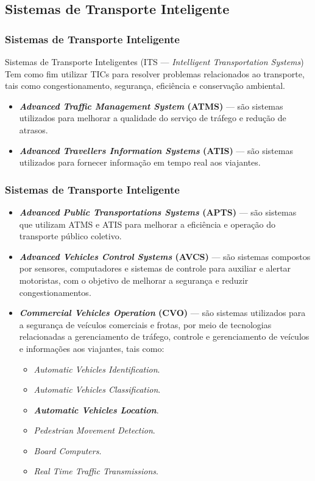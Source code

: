 \documentclass{beamer}
\begin{document}
\subsection{Sistemas de Transporte Inteligente}
\begin{frame}
\frametitle{Sistemas de Transporte Inteligente}
\begin{block}{Sistemas de Transporte Inteligentes (ITS --- \textit{Intelligent Transportation Systems})}
Tem como fim utilizar TICs para resolver problemas relacionados ao transporte, tais como congestionamento, segurança, eficiência e conservação ambiental. 
\end{block}
\begin{itemize}
\item \textbf{\textit{Advanced Traffic Management System} (ATMS)} --- são sistemas utilizados para melhorar a qualidade do serviço de tráfego e redução de atrasos.
\item \textbf{\textit{Advanced Travellers Information Systems} (ATIS)} --- são sistemas utilizados para fornecer informação em tempo real aos viajantes.
\end{itemize}

\end{frame}
\begin{frame}
\frametitle{Sistemas de Transporte Inteligente}
\begin{itemize}
\item  \textbf{\textit{Advanced Public Transportations Systems} (APTS)} --- são sistemas que utilizam ATMS e ATIS para melhorar a eficiência e operação do transporte público coletivo.
\item \textbf{\textit{Advanced Vehicles Control Systems} (AVCS)} --- são sistemas compostos por sensores, computadores e sistemas de controle para auxiliar e alertar motoristas, com o objetivo de melhorar a segurança e reduzir congestionamentos.
\item \textbf{\textit{Commercial Vehicles Operation} (CVO)} --- são sistemas utilizados para a segurança de veículos comerciais e frotas, por meio de tecnologias relacionadas a gerenciamento de tráfego, controle e gerenciamento de veículos e informações aos viajantes, tais como:
\begin{itemize}
\item \textit{Automatic Vehicles Identification}.
\item \textit{Automatic Vehicles Classification}.
\item \textit{\textbf{Automatic Vehicles Location}}.
\item \textit{Pedestrian Movement Detection}.
\item \textit{Board Computers}.
\item \textit{Real Time Traffic Transmissions}.
\end{itemize}
\end{itemize}
\end{frame}
\end{document}

